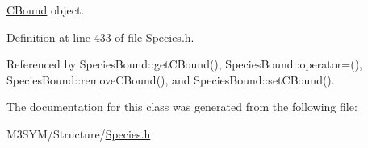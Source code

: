 \hyperlink{classCBound}{C\+Bound} object. 



Definition at line 433 of file Species.\+h.



Referenced by Species\+Bound\+::get\+C\+Bound(), Species\+Bound\+::operator=(), Species\+Bound\+::remove\+C\+Bound(), and Species\+Bound\+::set\+C\+Bound().



The documentation for this class was generated from the following file\+:\begin{DoxyCompactItemize}
\item 
M3\+S\+Y\+M/\+Structure/\hyperlink{Species_8h}{Species.\+h}\end{DoxyCompactItemize}
